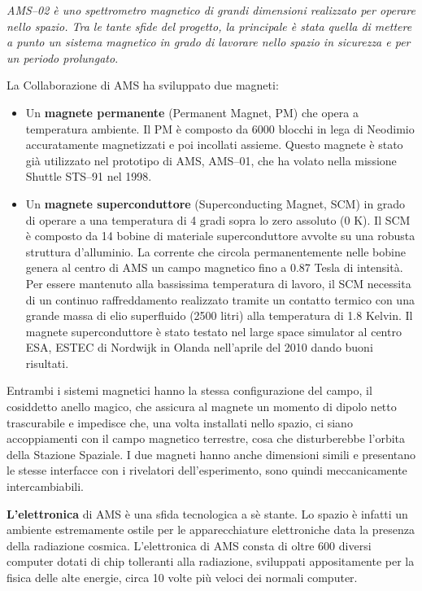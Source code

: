 \documentclass[12pt,a4paper]{article}
\begin{document}
\emph{AMS--02 è uno spettrometro magnetico di grandi dimensioni realizzato per operare nello spazio. Tra le tante sfide del progetto, la principale è stata quella di mettere a punto un sistema magnetico in grado di lavorare nello spazio in sicurezza e per un periodo prolungato}.

La Collaborazione di AMS ha sviluppato due magneti:

\begin{itemize}
\item Un \textbf{magnete permanente} (Permanent Magnet, PM) che opera a temperatura ambiente. Il PM è composto da 6000 blocchi in lega di Neodimio accuratamente magnetizzati e poi incollati assieme. Questo magnete è stato già utilizzato nel prototipo di AMS, AMS--01, che ha volato nella missione Shuttle STS--91 nel 1998.

\item Un \textbf{magnete superconduttore} (Superconducting Magnet, SCM) in grado di operare a una temperatura di 4 gradi sopra lo zero assoluto (0 K). Il SCM è composto da 14 bobine di materiale superconduttore avvolte su una robusta struttura d’alluminio. La corrente che circola permanentemente nelle bobine genera al centro di AMS un campo magnetico fino a 0.87 Tesla di intensità. Per essere mantenuto alla bassissima temperatura di lavoro, il SCM necessita di un continuo raffreddamento realizzato tramite un contatto termico con una grande massa di elio superfluido (2500 litri) alla temperatura di 1.8 Kelvin. Il magnete superconduttore è stato testato nel large space simulator al centro ESA, ESTEC di Nordwijk in Olanda nell’aprile del 2010 dando buoni risultati.

\end{itemize}

Entrambi i sistemi magnetici hanno la stessa configurazione del campo, il cosiddetto anello magico, che assicura al magnete un momento di dipolo netto trascurabile e impedisce che, una volta installati nello spazio, ci siano accoppiamenti con il campo magnetico terrestre, cosa che disturberebbe l’orbita della Stazione Spaziale. I due magneti hanno anche dimensioni simili e presentano le stesse interfacce con i rivelatori dell’esperimento, sono quindi meccanicamente intercambiabili.

\textbf{L’elettronica} di AMS è una sfida tecnologica a sè stante. Lo spazio è infatti un ambiente estremamente ostile per le apparecchiature elettroniche data la presenza della radiazione cosmica. L’elettronica di AMS consta di oltre 600 diversi computer dotati di chip tolleranti alla radiazione, sviluppati appositamente per la fisica delle alte energie, circa 10 volte più veloci dei normali computer.
\end{document}
